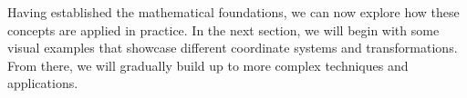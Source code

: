\pagebreak

Having established the mathematical foundations, we can now explore how these concepts are applied in practice. In the next section, we will begin with some visual examples that showcase different coordinate systems and transformations. From there, we will gradually build up to more complex techniques and applications.
